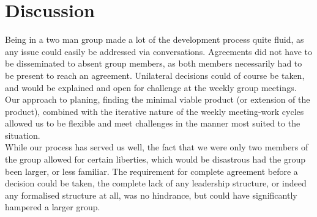 \section{Discussion}
Being in a two man group made a lot of the development process quite fluid, as any issue could easily be addressed via conversations. Agreements did not have to be disseminated to absent group members, as both members necessarily had to be present to reach an agreement. Unilateral decisions could of course be taken, and would be explained and open for challenge at the weekly group meetings. Our approach to planing, finding the minimal viable product (or extension of the product), combined with the iterative nature of the weekly meeting-work cycles allowed us to be flexible and meet challenges in the manner most suited to the situation.\\ 

While our process has served us well, the fact that we were only two members of the group allowed for certain liberties, which would be disastrous had the group been larger, or less familiar. The requirement for complete agreement before a decision could be taken, the complete lack of any leadership structure, or indeed any formalised structure at all, was no hindrance, but could have significantly hampered a larger group. 
